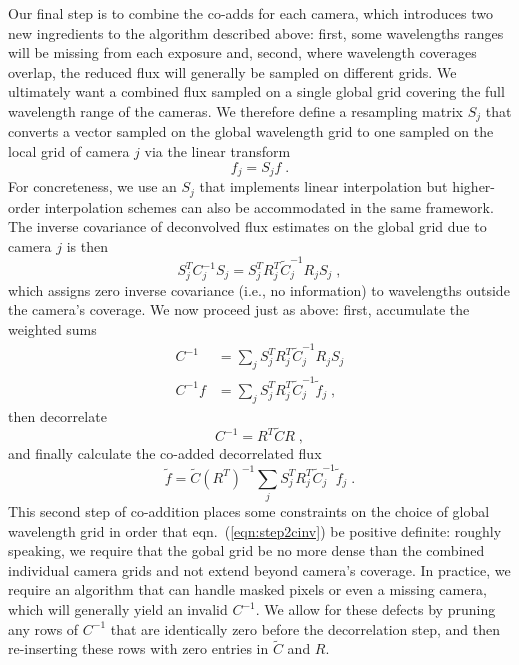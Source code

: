 \documentclass[12pt]{article}
\providecommand{\eqn}[1]{eqn.~(\ref{eqn:#1})}
\begin{document}
Our final step is to combine the co-adds for each camera, which introduces two new ingredients to the algorithm described above: first, some wavelengths ranges will be missing from each exposure and, second, where wavelength coverages overlap, the reduced flux will generally be sampled on different grids. We ultimately want a combined flux sampled on a single global grid covering the full wavelength range of the cameras. We therefore define a resampling matrix $S_j$ that converts a vector sampled on the global wavelength grid to one sampled on the local grid of camera $j$ via the linear transform
\begin{equation}
f_j = S_j f \; .
\end{equation}
For concreteness, we use an $S_j$ that implements linear interpolation but higher-order interpolation schemes can also be accommodated in the same framework. The inverse covariance of deconvolved flux estimates on the global grid due to camera $j$ is then
\begin{equation}
S_j^T C_j^{-1} S_j = S_j^T R_j^T \tilde{C}_j^{-1} R_j S_j \; ,
\end{equation}
which assigns zero inverse covariance (i.e., no information) to wavelengths outside the camera's coverage. We now proceed just as above: first, accumulate the weighted sums
\begin{align}
C^{-1} &= \sum_j S_j^T R_j^T \tilde{C}_j^{-1} R_j S_j \label{eqn:step2cinv} \\
C^{-1}f &= \sum_j S_j^T R_j^T \tilde{C}_j^{-1} \tilde{f}_j \; ,
\end{align}
then decorrelate
\begin{equation}
C^{-1} = R^T \tilde{C} R \; ,
\end{equation}
and finally calculate the co-added decorrelated flux
\begin{equation}
\tilde{f} = \tilde{C} (R^T)^{-1} \sum_j S_j^T R_j^T \tilde{C}_j^{-1} \tilde{f}_j \; .
\label{eqn:step2}
\end{equation}
This second step of co-addition places some constraints on the choice of global wavelength grid in order that \eqn{step2cinv} be positive definite: roughly speaking, we require that the gobal grid be no more dense than the combined individual camera grids and not extend beyond camera's coverage. In practice, we require an algorithm that can handle masked pixels or even a missing camera, which will generally yield an invalid $C^{-1}$. We allow for these defects by pruning any rows of $C^{-1}$ that are identically zero before the decorrelation step, and then re-inserting these rows with zero entries in $\tilde{C}$ and $R$.
\end{document}
